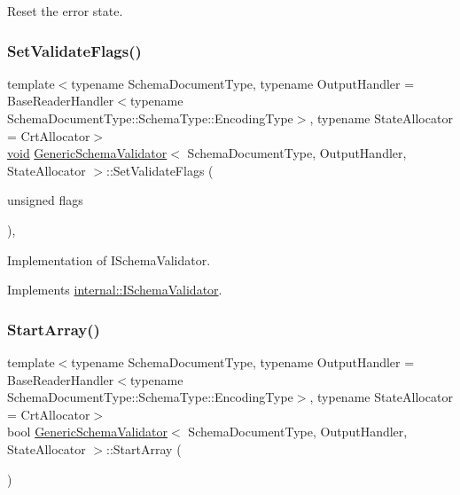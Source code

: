 Reset the error state. 

\mbox{\label{classGenericSchemaValidator_af4840dac2410bcfe73912c30eb95b875}} 
\subsubsection{\texorpdfstring{Set\+Validate\+Flags()}{SetValidateFlags()}}
{\footnotesize\ttfamily template$<$typename Schema\+Document\+Type, typename Output\+Handler = Base\+Reader\+Handler$<$typename Schema\+Document\+Type\+::\+Schema\+Type\+::\+Encoding\+Type$>$, typename State\+Allocator = Crt\+Allocator$>$ \\
\hyperlink{imgui__impl__opengl3__loader_8h_ac668e7cffd9e2e9cfee428b9b2f34fa7}{void} \hyperlink{classGenericSchemaValidator}{Generic\+Schema\+Validator}$<$ Schema\+Document\+Type, Output\+Handler, State\+Allocator $>$\+::Set\+Validate\+Flags (\begin{DoxyParamCaption}\item[{unsigned}]{flags }\end{DoxyParamCaption})\hspace{0.3cm}{\ttfamily [inline]}, {\ttfamily [virtual]}}



Implementation of I\+Schema\+Validator. 



Implements \hyperlink{classinternal_1_1ISchemaValidator_a29b7df0935c87630bbb70c1e19d4c722}{internal\+::\+I\+Schema\+Validator}.

\mbox{\label{classGenericSchemaValidator_aba13751f802531ed8cbd850778ea993c}} 
\subsubsection{\texorpdfstring{Start\+Array()}{StartArray()}}
{\footnotesize\ttfamily template$<$typename Schema\+Document\+Type, typename Output\+Handler = Base\+Reader\+Handler$<$typename Schema\+Document\+Type\+::\+Schema\+Type\+::\+Encoding\+Type$>$, typename State\+Allocator = Crt\+Allocator$>$ \\
bool \hyperlink{classGenericSchemaValidator}{Generic\+Schema\+Validator}$<$ Schema\+Document\+Type, Output\+Handler, State\+Allocator $>$\+::Start\+Array (\begin{DoxyParamCaption}{ }\end{DoxyParamCaption})\hspace{0.3cm}{\ttfamily [inline]}}

